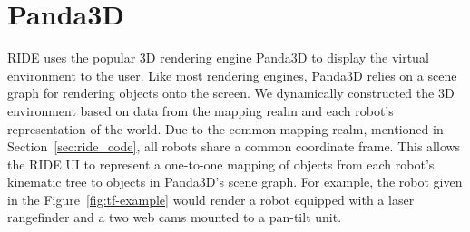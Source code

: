 % 
% 
% 
% 


\section{Panda3D}

RIDE uses the popular 3D rendering engine Panda3D to display the virtual environment to the user. Like most rendering engines, Panda3D relies on a scene graph for rendering objects onto the screen. We dynamically constructed the 3D environment based on data from the mapping realm and each robot's representation of the world. Due to the common mapping realm, mentioned in Section~\ref{sec:ride_code}, all robots share a common coordinate frame. This allows the RIDE UI to represent a one-to-one mapping of objects from each robot's kinematic tree to objects in Panda3D's scene graph. For example, the robot given in the Figure~\ref{fig:tf-example} would render a robot equipped with a laser rangefinder and a two web cams mounted to a pan-tilt unit.

